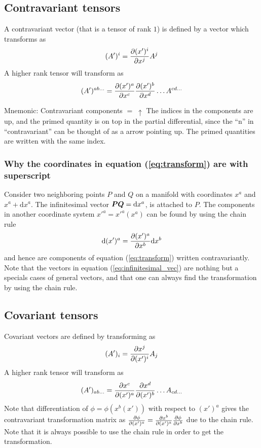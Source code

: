 \documentclass[a4paper, 12pt]{article}
\begin{document}
\subsection{Contravariant tensors}
A contravariant vector (that is a tensor of rank $1$) is defined by a vector 
which transforms as
%
\begin{align*}
 (A')^i = \frac{\partial {(x')^i}}{\partial{x^j}} A^j
\end{align*}
%
A higher rank tensor will transform as
%
\begin{align*}
 (A')^{ab\ldots} = \frac{\partial {(x')^{a}}}{\partial{x^{c}}}\frac{\partial {(x')^{b}}}{\partial{x^{d}}}\ldots 
A^{cd\ldots}
\end{align*}
%

\vspace{0.5cm}
\begin{greenbox}{Mnemonic: Contravariant components $= \; \uparrow$}
 The indices in the components are up, and the primed quantity is on 
top in the partial differential, since the ``n'' in ``contravariant'' can be 
thought of as a arrow pointing up. The primed quantities are written with the 
same index.
\end{greenbox}
%
\subsubsection{Why the coordinates in equation (\ref{eq:transform}) are with 
superscript}
Consider two neighboring points $P$ and $Q$ on a manifold with coordinates 
$x^a$ and $x^a + \text{d}x^a$. The infinitesimal vector $\boldsymbol{PQ} = 
\text{d}x^a$, is attached to $P$. The components in another coordinate system 
$x'^a=x'^a(x^a)$ can be found by using the chain rule
%
\begin{align}
 \text{d}(x')^a = \frac{\partial {(x')^a}}{\partial{x^b}}\text{d}x^b \label{eq:infinitesimal_vec}
\end{align}
%
and hence are components of equation (\ref{eq:transform}) written 
contravariantly. Note that the vectors in equation (\ref{eq:infinitesimal_vec}) 
are nothing but a specials cases of general vectors, and that one can always 
find the transformation by using the chain rule.



\subsection{Covariant tensors}
Covariant vectors are defined by transforming as
%
\begin{align*}
 (A')_i = \frac{\partial {x^j}}{\partial{(x')^i}} A_j
\end{align*}
%
A higher rank tensor will transform as
%
\begin{align*}
 (A')_{ab\ldots} = \frac{\partial {x^{c}}}{\partial{(x')^{a}}}\frac{\partial {x^{d}}}{\partial{(x')^{b}}}\ldots 
A_{cd\ldots}
\end{align*}
%
Note that differentiation of $\phi=\phi(x^b(x'))$ with respect to $(x')^a$ 
gives the contravariant transformation matrix as 
$\frac{\partial {\phi}}{\partial{(x')^a}}=\frac{\partial {x^b}}{\partial{(x')^a}}\frac{\partial {\phi}}{\partial{x^b}}$ due to the chain 
rule. Note that it is always possible to use the chain rule in order to get 
the transformation\label{foot:phi}.
\end{document}
